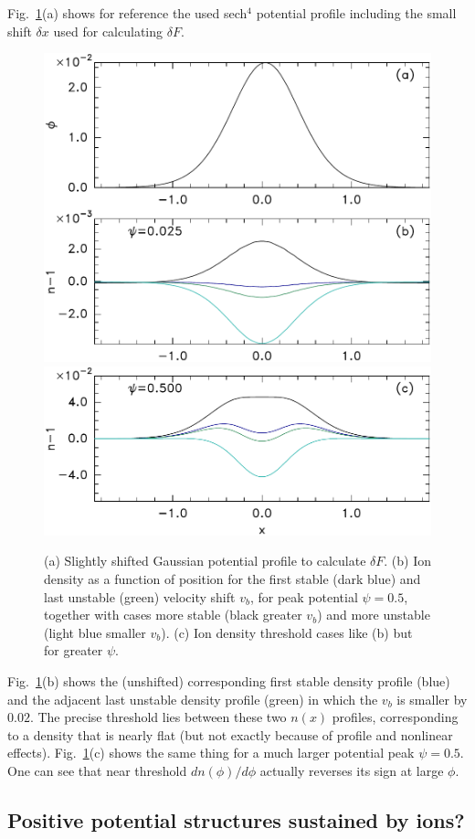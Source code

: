 \documentclass[pre]{revtex4-2}
\begin{document}
Fig.\ \ref{phinofx}(a) shows for reference the used sech$^4$ potential
profile including the small shift $\delta x$ used for calculating
$\delta F$.
\begin{figure}[htp]
  \centering
  \includegraphics[width=0.5\hsize]{phinofx}
  \includegraphics[width=0.5\hsize]{phinofx3}
  \caption{(a) Slightly shifted Gaussian potential profile to
    calculate $\delta F$. (b) Ion density as a function of position
    for the first stable (dark blue) and last unstable (green)
    velocity shift $v_b$, for peak potential $\psi=0.5$, together with
    cases more stable (black greater $v_b$) and more unstable (light
    blue smaller $v_b$). (c) Ion density threshold cases like (b) but
    for greater $\psi$.}\label{phinofx}
\end{figure}
Fig.\ \ref{phinofx}(b) shows the (unshifted) corresponding first
stable density profile (blue) and the adjacent last unstable density
profile (green) in which the $v_b$ is smaller by $0.02$. The precise
threshold lies between these two $n(x)$ profiles, corresponding to a
density that is nearly flat (but not exactly because of profile and
nonlinear effects).  Fig.\ \ref{phinofx}(c) shows the same thing for a
much larger potential peak $\psi=0.5$. One can see that near threshold
$dn(\phi)/d\phi$ actually reverses its sign at large $\phi$.


\subsection{Positive potential structures sustained by ions?}
\end{document}
